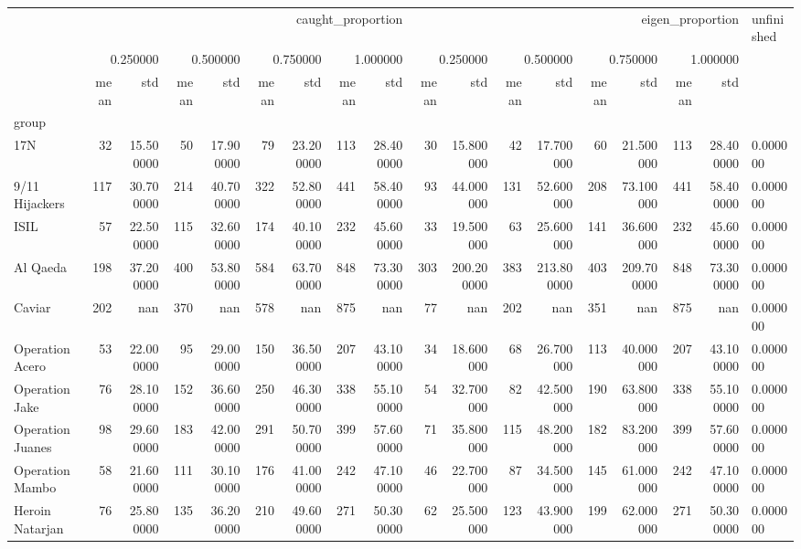 \begin{tabular}{lrrrrrrrrrrrrrrrrl}
 & \multicolumn{8}{r}{caught_proportion} & \multicolumn{8}{r}{eigen_proportion} & unfinished \\
 & \multicolumn{2}{r}{0.250000} & \multicolumn{2}{r}{0.500000} & \multicolumn{2}{r}{0.750000} & \multicolumn{2}{r}{1.000000} & \multicolumn{2}{r}{0.250000} & \multicolumn{2}{r}{0.500000} & \multicolumn{2}{r}{0.750000} & \multicolumn{2}{r}{1.000000} &  \\
 & mean & std & mean & std & mean & std & mean & std & mean & std & mean & std & mean & std & mean & std &  \\
group &  &  &  &  &  &  &  &  &  &  &  &  &  &  &  &  &  \\
17N & 32 & 15.500000 & 50 & 17.900000 & 79 & 23.200000 & 113 & 28.400000 & 30 & 15.800000 & 42 & 17.700000 & 60 & 21.500000 & 113 & 28.400000 & 0.000000 \\
9/11 Hijackers & 117 & 30.700000 & 214 & 40.700000 & 322 & 52.800000 & 441 & 58.400000 & 93 & 44.000000 & 131 & 52.600000 & 208 & 73.100000 & 441 & 58.400000 & 0.000000 \\
ISIL & 57 & 22.500000 & 115 & 32.600000 & 174 & 40.100000 & 232 & 45.600000 & 33 & 19.500000 & 63 & 25.600000 & 141 & 36.600000 & 232 & 45.600000 & 0.000000 \\
Al Qaeda & 198 & 37.200000 & 400 & 53.800000 & 584 & 63.700000 & 848 & 73.300000 & 303 & 200.200000 & 383 & 213.800000 & 403 & 209.700000 & 848 & 73.300000 & 0.000000 \\
Caviar & 202 & nan & 370 & nan & 578 & nan & 875 & nan & 77 & nan & 202 & nan & 351 & nan & 875 & nan & 0.000000 \\
Operation Acero & 53 & 22.000000 & 95 & 29.000000 & 150 & 36.500000 & 207 & 43.100000 & 34 & 18.600000 & 68 & 26.700000 & 113 & 40.000000 & 207 & 43.100000 & 0.000000 \\
Operation Jake & 76 & 28.100000 & 152 & 36.600000 & 250 & 46.300000 & 338 & 55.100000 & 54 & 32.700000 & 82 & 42.500000 & 190 & 63.800000 & 338 & 55.100000 & 0.000000 \\
Operation Juanes & 98 & 29.600000 & 183 & 42.000000 & 291 & 50.700000 & 399 & 57.600000 & 71 & 35.800000 & 115 & 48.200000 & 182 & 83.200000 & 399 & 57.600000 & 0.000000 \\
Operation Mambo & 58 & 21.600000 & 111 & 30.100000 & 176 & 41.000000 & 242 & 47.100000 & 46 & 22.700000 & 87 & 34.500000 & 145 & 61.000000 & 242 & 47.100000 & 0.000000 \\
Heroin Natarjan & 76 & 25.800000 & 135 & 36.200000 & 210 & 49.600000 & 271 & 50.300000 & 62 & 25.500000 & 123 & 43.900000 & 199 & 62.000000 & 271 & 50.300000 & 0.000000 \\

\end{tabular}
